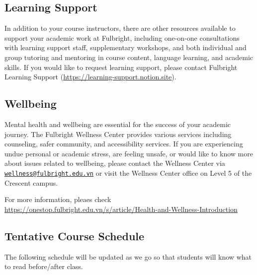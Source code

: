 \documentclass[
]{article}
\begin{document}
\hypertarget{learning-support}{%
\subsection*{Learning Support}\label{learning-support}}

In addition to your course instructors, there are other resources available to support your
academic work at Fulbright, including one-on-one consultations with learning support staff,
supplementary workshops, and both individual and group tutoring and mentoring in course
content, language learning, and academic skills. If you would like to request learning support,
please contact Fulbright Learning Support (\url{https://learning-support.notion.site}).

\hypertarget{wellbeing}{%
\subsection*{Wellbeing}\label{wellbeing}}

Mental health and wellbeing are essential for the success of your academic journey. The
Fulbright Wellness Center provides various services including counseling, safer community,
and accessibility services. If you are experiencing undue personal or academic stress, are
feeling unsafe, or would like to know more about issues related to wellbeing, please contact
the Wellness Center via \href{mailto:wellness@fulbright.edu.vn}{\nolinkurl{wellness@fulbright.edu.vn}} or visit the Wellness Center office on
Level 5 of the Crescent campus.

For more information, pleaes check
\url{https://onestop.fulbright.edu.vn/s/article/Health-and-Wellness-Introduction}

\newpage

\hypertarget{tentative-course-schedule}{%
\subsection*{Tentative Course Schedule}\label{tentative-course-schedule}}

The following schedule will be updated as we go so that students will know what to read
before/after class.
\end{document}
